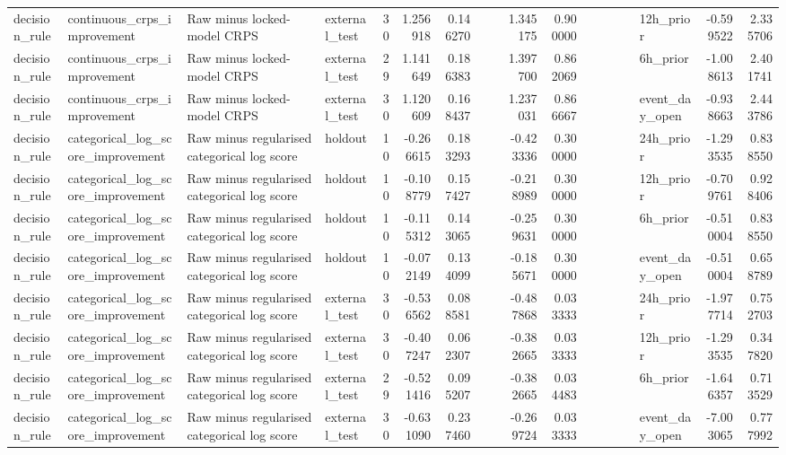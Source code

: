 \begin{tabular}{llllrrrrrrrlrrllrr}
decision\_rule & continuous\_crps\_improvement & Raw minus locked-model CRPS & external\_test & 30 & 1.256918 & 0.146270 &  &  & 1.345175 & 0.900000 &  &  &  &  & 12h\_prior & -0.599522 & 2.335706 \\
decision\_rule & continuous\_crps\_improvement & Raw minus locked-model CRPS & external\_test & 29 & 1.141649 & 0.186383 &  &  & 1.397700 & 0.862069 &  &  &  &  & 6h\_prior & -1.008613 & 2.401741 \\
decision\_rule & continuous\_crps\_improvement & Raw minus locked-model CRPS & external\_test & 30 & 1.120609 & 0.168437 &  &  & 1.237031 & 0.866667 &  &  &  &  & event\_day\_open & -0.938663 & 2.443786 \\
decision\_rule & categorical\_log\_score\_improvement & Raw minus regularised categorical log score & holdout & 10 & -0.266615 & 0.183293 &  &  & -0.423336 & 0.300000 &  &  &  &  & 24h\_prior & -1.293535 & 0.838550 \\
decision\_rule & categorical\_log\_score\_improvement & Raw minus regularised categorical log score & holdout & 10 & -0.108779 & 0.157427 &  &  & -0.218989 & 0.300000 &  &  &  &  & 12h\_prior & -0.709761 & 0.928406 \\
decision\_rule & categorical\_log\_score\_improvement & Raw minus regularised categorical log score & holdout & 10 & -0.115312 & 0.143065 &  &  & -0.259631 & 0.300000 &  &  &  &  & 6h\_prior & -0.510004 & 0.838550 \\
decision\_rule & categorical\_log\_score\_improvement & Raw minus regularised categorical log score & holdout & 10 & -0.072149 & 0.134099 &  &  & -0.185671 & 0.300000 &  &  &  &  & event\_day\_open & -0.510004 & 0.658789 \\
decision\_rule & categorical\_log\_score\_improvement & Raw minus regularised categorical log score & external\_test & 30 & -0.536562 & 0.088581 &  &  & -0.487868 & 0.033333 &  &  &  &  & 24h\_prior & -1.977714 & 0.752703 \\
decision\_rule & categorical\_log\_score\_improvement & Raw minus regularised categorical log score & external\_test & 30 & -0.407247 & 0.062307 &  &  & -0.382665 & 0.033333 &  &  &  &  & 12h\_prior & -1.293535 & 0.347820 \\
decision\_rule & categorical\_log\_score\_improvement & Raw minus regularised categorical log score & external\_test & 29 & -0.521416 & 0.095207 &  &  & -0.382665 & 0.034483 &  &  &  &  & 6h\_prior & -1.646357 & 0.713529 \\
decision\_rule & categorical\_log\_score\_improvement & Raw minus regularised categorical log score & external\_test & 30 & -0.631090 & 0.237460 &  &  & -0.269724 & 0.033333 &  &  &  &  & event\_day\_open & -7.003065 & 0.777992 \\

\end{tabular}
